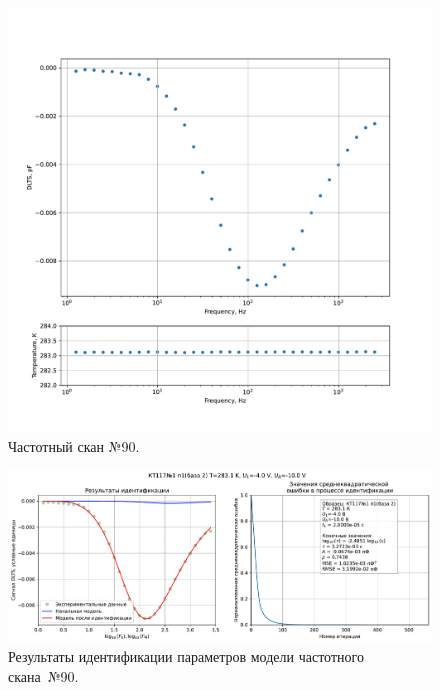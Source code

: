 \begin{figure}[!ht]
    \centering
    \includegraphics[width=1\textwidth]{../plots/КТ117№1_п1(база 2)_2500Гц-1Гц_1пФ_+10С_-4В-10В_200мВ_20мкс_шаг_0,1.pdf}
    \caption{Частотный скан №90.}
    \label{pic:frequency_scan_90}
\end{figure}

\begin{figure}[!ht]
    \centering
    \includegraphics[width=1\textwidth]{../plots/КТ117№1_п1(база 2)_2500Гц-1Гц_1пФ_+10С_-4В-10В_200мВ_20мкс_шаг_0,1_model.pdf}
    \caption{Результаты идентификации параметров модели частотного скана~№90.}
    \label{pic:frequency_scan_model90}
\end{figure}

\pagebreak


